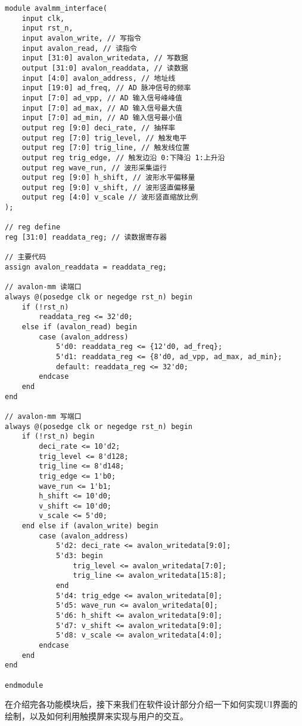 \documentclass[lang=cn,a4paper,newtx]{elegantpaper}
\begin{document}
\begin{lstlisting}
module avalmm_interface(
    input clk,
    input rst_n,
    input avalon_write, // 写指令
    input avalon_read, // 读指令
    input [31:0] avalon_writedata, // 写数据
    output [31:0] avalon_readdata, // 读数据
    input [4:0] avalon_address, // 地址线
    input [19:0] ad_freq, // AD 脉冲信号的频率
    input [7:0] ad_vpp, // AD 输入信号峰峰值
    input [7:0] ad_max, // AD 输入信号最大值
    input [7:0] ad_min, // AD 输入信号最小值
    output reg [9:0] deci_rate, // 抽样率
    output reg [7:0] trig_level, // 触发电平
    output reg [7:0] trig_line, // 触发线位置
    output reg trig_edge, // 触发边沿 0:下降沿 1:上升沿
    output reg wave_run, // 波形采集运行
    output reg [9:0] h_shift, // 波形水平偏移量
    output reg [9:0] v_shift, // 波形竖直偏移量
    output reg [4:0] v_scale // 波形竖直缩放比例
);

// reg define
reg [31:0] readdata_reg; // 读数据寄存器

// 主要代码
assign avalon_readdata = readdata_reg;

// avalon-mm 读端口
always @(posedge clk or negedge rst_n) begin
    if (!rst_n)
        readdata_reg <= 32'd0;
    else if (avalon_read) begin
        case (avalon_address)
            5'd0: readdata_reg <= {12'd0, ad_freq};
            5'd1: readdata_reg <= {8'd0, ad_vpp, ad_max, ad_min};
            default: readdata_reg <= 32'd0;
        endcase
    end
end

// avalon-mm 写端口
always @(posedge clk or negedge rst_n) begin
    if (!rst_n) begin
        deci_rate <= 10'd2;
        trig_level <= 8'd128;
        trig_line <= 8'd148;
        trig_edge <= 1'b0;
        wave_run <= 1'b1;
        h_shift <= 10'd0;
        v_shift <= 10'd0;
        v_scale <= 5'd0;
    end else if (avalon_write) begin
        case (avalon_address)
            5'd2: deci_rate <= avalon_writedata[9:0];
            5'd3: begin
                trig_level <= avalon_writedata[7:0];
                trig_line <= avalon_writedata[15:8];
            end
            5'd4: trig_edge <= avalon_writedata[0];
            5'd5: wave_run <= avalon_writedata[0];
            5'd6: h_shift <= avalon_writedata[9:0];
            5'd7: v_shift <= avalon_writedata[9:0];
            5'd8: v_scale <= avalon_writedata[4:0];
        endcase
    end
end

endmodule

\end{lstlisting}

在介绍完各功能模块后，接下来我们在软件设计部分介绍一下如何实现UI界面的绘制，以及如何利用触摸屏来实现与用户的交互。
\end{document}
